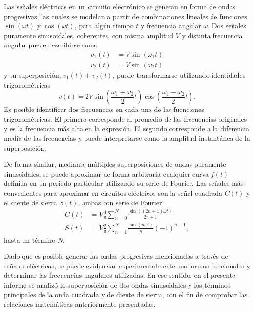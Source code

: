 Las señales eléctricas en un circuito electrónico se generan en forma de ondas
progresivas, las cuales se modelan a partir de combinaciones lineales de funciones
$\sin(\omega t)$ y $\cos(\omega t)$, para algún tiempo $t$ y frecuencia angular $\omega$.
Dos señales puramente sinusoidales, coherentes, con misma amplitud $V$ y distinta
frecuencia angular pueden escribirse como
\begin{align*}
	v_1(t) &= V\sin(\omega_1 t) \\
	v_2(t) &= V\sin(\omega_2 t)
\end{align*}
y su superposición, $v_1(t)+v_2(t)$, puede transformarse utilizando identidades
trigonométricas
\begin{equation}\label{eq:super}
	v(t) = 2V\sin\left( \frac{\omega_1+\omega_2}{2} t \right)
			\cos\left( \frac{\omega_1-\omega_2}{2} t \right).
\end{equation}
Es posible identificar dos frecuencias en cada una de las fucnciones trigonométricas.
El primero corresponde al promedio de las frecuencias originales y es la frecuencia
más alta en la expresión. El segundo corresponde a la diferencia media de las
frecuencias y puede interpretarse como la amplitud instantánea de la superposición.

De forma similar, mediante múltiples superposiciones de ondas puramente sinusoidales,
se puede aproximar de forma arbitraria cualquier curva $f(t)$ definida en un periodo
particular utilizando su serie de Fourier. Las señales más convenientes para aproximar
en circuitos eléctricos son la señal cuadrada $C(t)$ y el diente de sierra $S(t)$, ambas
con serie de Fourier
\begin{align}
	C(t) &= V\frac{4}{\pi}\sum_{n=0}^N \frac{\sin( (2n+1)\omega t  )}{2n+1}\label{eq:C} \\
	S(t) &= V\frac{2}{\pi}\sum_{n=1}^N \frac{\sin(n\omega t)}{n}(-1)^{n-1},\label{eq:S}
\end{align}
hasta un término $N$.

Dado que es posible generar las ondas progresivas mencionadas a través de
señales eléctricas, se puede evidenciar experimentalmente sus formas funcionales y
determinar las frecuencias angulares utilizadas. En ese sentido, en el presente informe
se analizó la superposición de dos ondas sinusoidales y los términos principales de
la onda cuadrada y de diente de sierra, con el fin de comprobar las relaciones matemáticas
anteriormente presentadas.